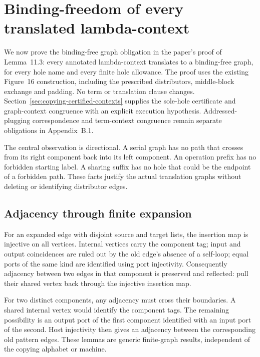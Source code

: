 \clearpage
\section{Binding-freedom of every translated lambda-context}
\label{sec:copying-context-binding}
We now prove the binding-free graph obligation in the paper's proof of
Lemma~11.3: every annotated lambda-context translates to a binding-free graph,
for every hole name and every finite hole allowance. The proof uses the
existing Figure~16 construction, including the prescribed distributors,
middle-block exchange and padding. No term or translation clause changes.
Section~\ref{sec:copying-certified-contexts} supplies the sole-hole certificate
and graph-context congruence with an explicit execution hypothesis.
Addressed-plugging correspondence and term-context congruence remain
separate obligations in Appendix~B.1.

The central observation is directional. A serial graph has no path that
crosses from its right component back into its left component. An operation
prefix has no forbidden starting label. A sharing suffix has no hole that
could be the endpoint of a forbidden path. These facts justify the actual
translation graphs without deleting or identifying distributor edges.

\subsection{Adjacency through finite expansion}


For an expanded edge with disjoint source and target lists, the insertion
map is injective on all vertices. Internal vertices carry the component tag;
input and output coincidences are ruled out by the old edge's absence of a
self-loop; equal ports of the same kind are identified using port injectivity.
Consequently adjacency between two edges in that component is preserved and
reflected: pull their shared vertex back through the injective insertion map.

For two distinct components, any adjacency must cross their boundaries.
A shared internal vertex would identify the component tags. The remaining
possibility is an output port of the first component identified with an
input port of the second. Host injectivity then gives an adjacency between
the corresponding old pattern edges. These lemmas are generic finite-graph
results, independent of the copying alphabet or machine.

